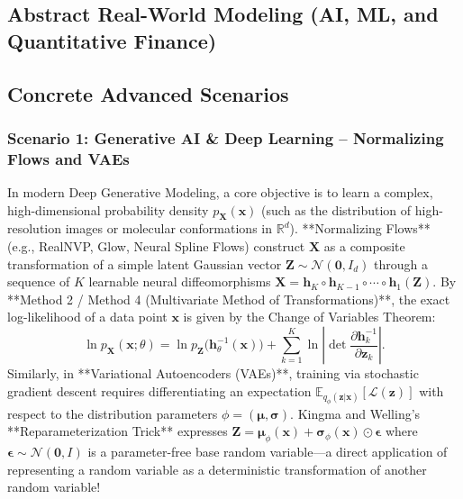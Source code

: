 \documentclass[11pt, letterpaper]{article}
\theoremstyle{definition}
\theoremstyle{remark}
\newcommand{\R}{\mathbb{R}}
\newcommand{\E}{\mathbb{E}}
\begin{document}
\begin{itemize}
\section{Abstract Real-World Modeling (AI, ML, and Quantitative Finance)}

\subsection{Concrete Advanced Scenarios}

\subsubsection*{Scenario 1: Generative AI \& Deep Learning -- Normalizing Flows and VAEs}
In modern Deep Generative Modeling, a core objective is to learn a complex, high-dimensional probability density $p_{\mathbf{X}}(\mathbf{x})$ (such as the distribution of high-resolution images or molecular conformations in $\R^d$). **Normalizing Flows** (e.g., RealNVP, Glow, Neural Spline Flows) construct $\mathbf{X}$ as a composite transformation of a simple latent Gaussian vector $\mathbf{Z} \sim \mathcal{N}(\mathbf{0}, I_d)$ through a sequence of $K$ learnable neural diffeomorphisms $\mathbf{X} = \mathbf{h}_K \circ \mathbf{h}_{K-1} \circ \cdots \circ \mathbf{h}_1(\mathbf{Z})$. By **Method 2 / Method 4 (Multivariate Method of Transformations)**, the exact log-likelihood of a data point $\mathbf{x}$ is given by the Change of Variables Theorem:
\[
    \ln p_{\mathbf{X}}(\mathbf{x}; \theta) = \ln p_{\mathbf{Z}}\big(\mathbf{h}_\theta^{-1}(\mathbf{x})\big) + \sum_{k=1}^K \ln \left| \det \frac{\partial \mathbf{h}_{k}^{-1}}{\partial \mathbf{z}_k} \right|.
\]
Similarly, in **Variational Autoencoders (VAEs)**, training via stochastic gradient descent requires differentiating an expectation $\E_{q_\phi(\mathbf{z}|\mathbf{x})}[\mathcal{L}(\mathbf{z})]$ with respect to the distribution parameters $\phi = (\boldsymbol{\mu}, \boldsymbol{\sigma})$. Kingma and Welling's **Reparameterization Trick** expresses $\mathbf{Z} = \boldsymbol{\mu}_\phi(\mathbf{x}) + \boldsymbol{\sigma}_\phi(\mathbf{x}) \odot \boldsymbol{\epsilon}$ where $\boldsymbol{\epsilon} \sim \mathcal{N}(\mathbf{0}, I)$ is a parameter-free base random variable---a direct application of representing a random variable as a deterministic transformation of another random variable!


\end{itemize}
\end{document}

